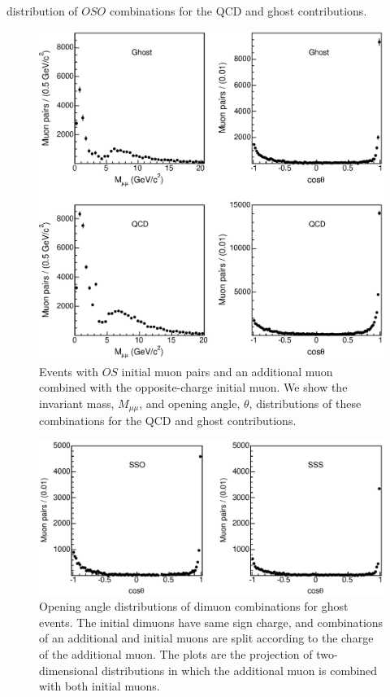 \documentclass[aps,prd,preprint,floatfix,nofootinbib,superscriptaddress,showpacs,amssymb]{revtex4}
\begin{document}
 distribution of $OSO$  combinations for the QCD and ghost contributions. 
 \begin{figure}
 \begin{center}
 \vspace{-0.3in}
 \leavevmode
 \includegraphics*[width=\textwidth]{fa0_10.eps}
 \caption[]{Events with $OS$ initial muon pairs and an additional muon
            combined with the opposite-charge initial muon. We
            show the invariant mass, $M_{\mu\mu}$, and opening angle,
            $\theta$, distributions of these combinations for the QCD
            and ghost contributions.}
 \label{fig:fig_10}
 \end{center}
 \end{figure}
 \begin{figure}
 \begin{center}
 \vspace{-0.3in}
 \leavevmode
 \includegraphics*[width=\textwidth]{fa0_11.eps}
 \caption[]{Opening angle distributions of dimuon combinations for ghost events. 
            The initial dimuons have same
            sign charge, and combinations of an additional and initial muons 
            are split according to the charge of the additional muon. The 
            plots are the projection of two-dimensional distributions in 
            which the additional muon is combined with both initial muons.}
 \label{fig:fig_11}
 \end{center}
 \end{figure}
\end{document}
